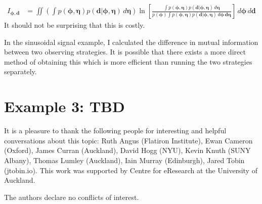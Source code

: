 \documentclass[entropy,article,accept,oneauthor,pdftex,10pt,a4paper]{mdpi}
\renewcommand{\d}{\boldsymbol{d}}
\newcommand{\bphi}{\boldsymbol{\phi}}
\newcommand{\boldeta}{\boldsymbol{\eta}}
\begin{document}
\begin{align}
I_{\bphi, \d} &= \iint
  \left(\int p(\bphi, \boldeta)p(\d | \bphi, \boldeta) \, d\boldeta\right)
                        \ln \left[
  \frac{\int p(\bphi, \boldeta)p(\d | \bphi, \boldeta) \, d\boldeta}
{p(\bphi)\int p(\bphi, \boldeta)p(\d | \bphi, \boldeta) \, d\bphi \, \d\boldeta}\right]
                        \, d\bphi \, d\d
\end{align}
It should not be surprising that this is costly.

In the sinusoidal signal example, I calculated the difference in
mutual information between two observing strategies. It is possible
that there exists a more direct method of obtaining this which
is more efficient than running the two strategies separately.

\section{Example 3: TBD}

It is a pleasure to thank the following people for interesting and helpful
conversations about this topic: Ruth Angus (Flatiron Institute),
Ewan Cameron (Oxford), James Curran (Auckland),
David Hogg (NYU), Kevin Knuth (SUNY Albany),
Thomas Lumley (Auckland),
Iain Murray (Edinburgh), Jared Tobin (jtobin.io).
This work was supported by Centre for eResearch
at the University of Auckland.




The authors declare no conflicts of interest.

%
\makeatletter
\renewcommand\@biblabel[1]{#1. }
\makeatother




\end{document}
